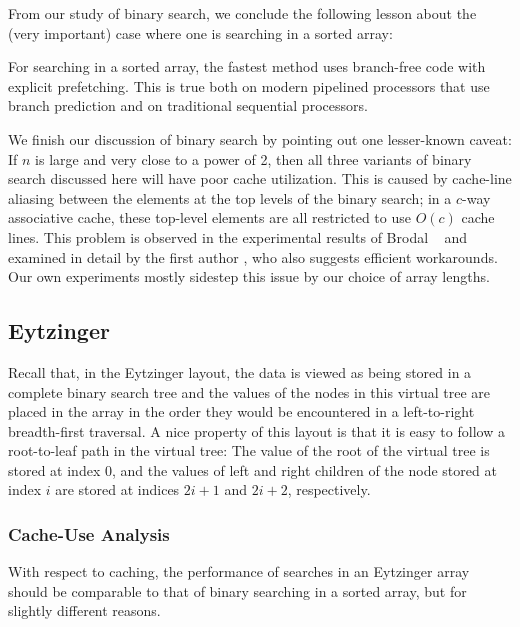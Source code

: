 \documentclass{patmorin}
\begin{document}
From our study of binary search, we conclude the following lesson about
the (very important) case where one is searching in a sorted array:

\begin{lesson}
  For searching in a sorted array, the fastest method uses branch-free
  code with explicit prefetching.  This is true both on modern pipelined
  processors that use branch prediction and on traditional sequential
  processors.
\end{lesson}

We finish our discussion of binary search by pointing out one lesser-known
caveat:  If $n$ is large and very close to a power of 2, then all
three variants of binary search discussed here will have poor cache
utilization.  This is caused by cache-line aliasing between the elements
at the top levels of the binary search; in a $c$-way associative cache,
these top-level elements are all restricted to use $O(c)$ cache lines.
This problem is observed in the experimental results of Brodal \etal\
\cite[Section~4.2]{brodal.fagerberg.ea:cache} and examined in detail
by the first author \cite{khuong:binary}, who also suggests efficient
workarounds. Our own experiments mostly sidestep this issue by our choice
of array lengths.

\subsection{Eytzinger}

Recall that, in the Eytzinger layout, the data is viewed as being
stored in a complete binary search tree and the values of the nodes in
this virtual tree are placed in the array in the order they would be
encountered in a left-to-right breadth-first traversal.  A nice property
of this layout is that it is easy to follow a root-to-leaf path in the
virtual tree: The value of the root of the virtual tree is stored at
index 0, and the values of left and right children of the node stored
at index $i$ are stored at indices $2i+1$ and $2i+2$, respectively.


\subsubsection{Cache-Use Analysis}

With respect to caching, the performance of searches in an Eytzinger
array should be comparable to that of binary searching in a sorted array,
but for slightly different reasons.
\end{document}
